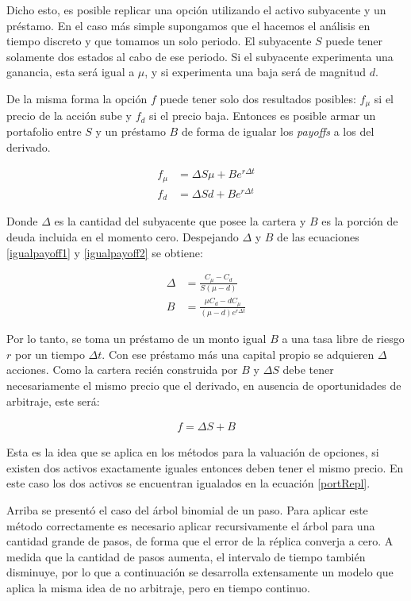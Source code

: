 Dicho esto, es posible replicar una opción utilizando el activo subyacente y un préstamo. En el caso más simple supongamos que el hacemos el análisis en tiempo discreto y que tomamos un solo periodo. El subyacente $S$ puede tener solamente dos estados al cabo de ese periodo. Si el subyacente experimenta una ganancia, esta será igual a $\mu$, y si experimenta una baja será de magnitud $d$.

De la misma forma la opción $f$ puede tener solo dos resultados posibles: $f_\mu$ si el precio de la acción sube y $f_d$ si el precio baja. Entonces es posible armar un portafolio entre $S$ y un préstamo $B$ de forma de igualar los \textit{payoffs} a los del derivado.

\begin{align}
	f_{\mu} &= \Delta S \mu + B e^{r \Delta t} \label{igualpayoff1} \\
	f_d &= \Delta S d + B e^{r \Delta t} \label{igualpayoff2}
\end{align}

Donde $\Delta$ es la cantidad del subyacente que posee la cartera y $B$ es la porción de deuda incluida en el momento cero. Despejando $\Delta$ y $B$ de las ecuaciones \eqref{igualpayoff1} y \eqref{igualpayoff2} se obtiene:

\begin{align}
	\Delta &= \frac{C_\mu - C_d}{S (\mu - d)} \label{portReplDelta} \\
	B &= \frac{\mu C_d - d C_\mu}{(\mu - d) e^{r \Delta t}} \label{portReplB}
\end{align}

Por lo tanto, se toma un préstamo de un monto igual $B$ a una tasa libre de riesgo $r$ por un tiempo $\Delta t$. Con ese préstamo más una capital propio se adquieren $\Delta$ acciones. Como la cartera recién construida por $B$ y $\Delta S$ debe tener necesariamente el mismo precio que el derivado, en ausencia de oportunidades de arbitraje, este será:

\begin{align}
	f = \Delta S + B \label{portRepl}
\end{align}

Esta es la idea que se aplica en los métodos para la valuación de opciones, si existen dos activos exactamente iguales entonces deben tener el mismo precio. En este caso los dos activos se encuentran igualados en la ecuación \eqref{portRepl}.

Arriba se presentó el caso del árbol binomial de un paso. Para aplicar este método correctamente es necesario aplicar recursivamente el árbol para una cantidad grande de pasos, de forma que el error de la réplica converja a cero. A medida que la cantidad de pasos aumenta, el intervalo de tiempo también disminuye, por lo que a continuación se desarrolla extensamente un modelo que aplica la misma idea de no arbitraje, pero en tiempo continuo.


